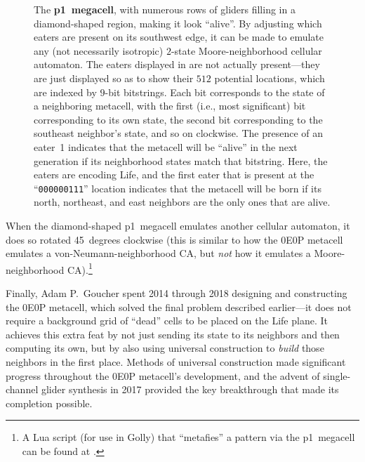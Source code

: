 \begin{figure}[!htb]
	\centering
	\caption{The \textbf{p1~megacell}, with numerous rows of gliders filling in a diamond-shaped region, making it look ``alive''. By adjusting which eaters are present on its southwest edge, it can be made to emulate any (not necessarily isotropic) $2$-state Moore-neighborhood cellular automaton. The eaters displayed in  are not actually present---they are just displayed so as to show their $512$ potential locations, which are indexed by $9$-bit bitstrings. Each bit corresponds to the state of a neighboring metacell, with the first (i.e., most significant) bit corresponding to its own state, the second bit corresponding to the southeast neighbor's state, and so on clockwise. The presence of an eater~1 indicates that the metacell will be ``alive'' in the next generation if its neighborhood states match that bitstring. Here, the eaters are encoding Life, and the first eater that is present at the ``\texttt{000000111}'' location indicates that the metacell will be born if its north, northeast, and east neighbors are the only ones that are alive.}
	\label{fig:p1_megacell}
\end{figure}

When the diamond-shaped p1~megacell emulates another cellular automaton, it does so rotated 45~degrees clockwise (this is similar to how the 0E0P metacell emulates a von-Neumann-neighborhood CA, but \emph{not} how it emulates a Moore-neighborhood CA).\footnote{A Lua script (for use in Golly) that ``metafies'' a pattern via the p1~megacell can be found at .}

Finally, Adam P.~Goucher spent 2014 through 2018 designing and constructing the 0E0P metacell, which solved the final problem described earlier---it does not require a background grid of ``dead'' cells to be placed on the Life plane. It achieves this extra feat by not just sending its state to its neighbors and then computing its own, but by also using universal construction to \emph{build} those neighbors in the first place. Methods of universal construction made significant progress throughout the 0E0P metacell's development, and the advent of single-channel glider synthesis in 2017 provided the key breakthrough that made its completion possible.



